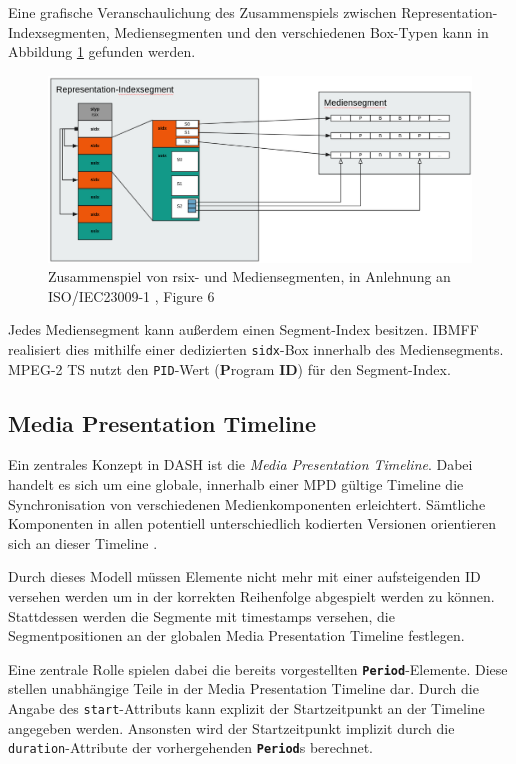 \documentclass[paper = a4, fontsize = 12pt, parskip = half]{scrartcl} %
\def\attr#1{\texttt{#1}}
\def\elem#1{\texttt{\textbf{#1}}}
\begin{document}
Eine grafische Veranschaulichung des Zusammenspiels zwischen Representation-Indexsegmenten, Mediensegmenten und den verschiedenen Box-Typen kann in Abbildung \ref{rsix_example} gefunden werden.

\begin{figure}[ht]
	\centering
	\includegraphics[width=16cm]{images/rsix.png}
	\caption{Zusammenspiel von rsix- und Mediensegmenten, in Anlehnung an ISO/IEC23009-1 \cite{international_organization_for_standardization_isoiec_nodate}, Figure 6}
	\label{rsix_example}
\end{figure}

Jedes Mediensegment kann außerdem einen Segment-Index besitzen. IBMFF realisiert dies mithilfe einer dedizierten \attr{sidx}-Box innerhalb des Mediensegments. MPEG-2 TS nutzt den \attr{PID}-Wert (\textbf{P}rogram \textbf{ID}) für den Segment-Index. 



\subsection{Media Presentation Timeline}
Ein zentrales Konzept in DASH ist die \textit{Media Presentation Timeline}. Dabei handelt es sich um eine globale, innerhalb einer MPD gültige Timeline die Synchronisation von verschiedenen Medienkomponenten erleichtert. Sämtliche Komponenten in allen potentiell unterschiedlich kodierten Versionen orientieren sich an dieser Timeline \cite{international_organization_for_standardization_isoiec_nodate}.

Durch dieses Modell müssen Elemente nicht mehr mit einer aufsteigenden ID versehen werden um in der korrekten Reihenfolge abgespielt werden zu können. Stattdessen werden die Segmente mit timestamps versehen, die Segmentpositionen an der globalen Media Presentation Timeline festlegen.

Eine zentrale Rolle spielen dabei die bereits vorgestellten \elem{Period}-Elemente. Diese stellen unabhängige Teile in der Media Presentation Timeline dar. Durch die Angabe des \attr{start}-Attributs kann explizit der Startzeitpunkt an der Timeline angegeben werden. Ansonsten wird der Startzeitpunkt implizit durch die \attr{duration}-Attribute der vorhergehenden \elem{Period}s berechnet.
\end{document}
